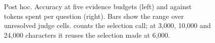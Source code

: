 \begin{figure}[tp]
\caption{Post hoc. Accuracy at five evidence budgets (left) and against tokens spent per question (right). Bars show the range over unresolved judge cells. \lexb{} counts the selection call; at 3,000, 10,000 and 24,000 characters it reuses the selection made at 6,000.}
\label{fig:budget}
\end{figure}
